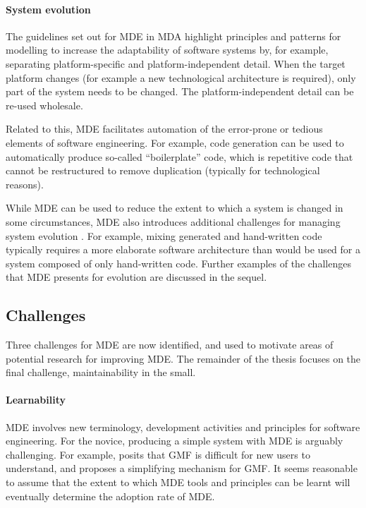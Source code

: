 \paragraph{System evolution} The guidelines set out for MDE in MDA \cite{mda} highlight principles and patterns for modelling to increase the adaptability of software systems by, for example, separating platform-specific and platform-independent detail. When the target platform changes (for example a new technological architecture is required), only part of the system needs to be changed. The platform-independent detail can be re-used wholesale. 

Related to this, MDE facilitates automation of the error-prone or tedious elements of software engineering. For example, code generation can be used to automatically produce so-called ``boilerplate'' code, which is repetitive code that cannot be restructured to remove duplication (typically for technological reasons).

While MDE can be used to reduce the extent to which a system is changed in some circumstances, MDE also introduces additional challenges for managing system evolution \cite{Mens07}. For example, mixing generated and hand-written code typically requires a more elaborate software architecture than would be used for a system composed of only hand-written code. Further examples of the challenges that MDE presents for evolution are discussed in the sequel.

\subsection{Challenges}
\label{subsec:mde_challenges}
Three challenges for MDE are now identified, and used to motivate areas of potential research for improving MDE. The remainder of the thesis focuses on the final challenge, maintainability in the small.

\paragraph{Learnability} MDE involves new terminology, development activities and principles for software engineering. For the novice, producing a simple system with MDE is arguably challenging. For example, \cite{kolovos10eugenia} posits that GMF is difficult for new users to understand, and proposes a simplifying mechanism for GMF. It seems reasonable to assume that the extent to which MDE tools and principles can be learnt will eventually determine the adoption rate of MDE.

